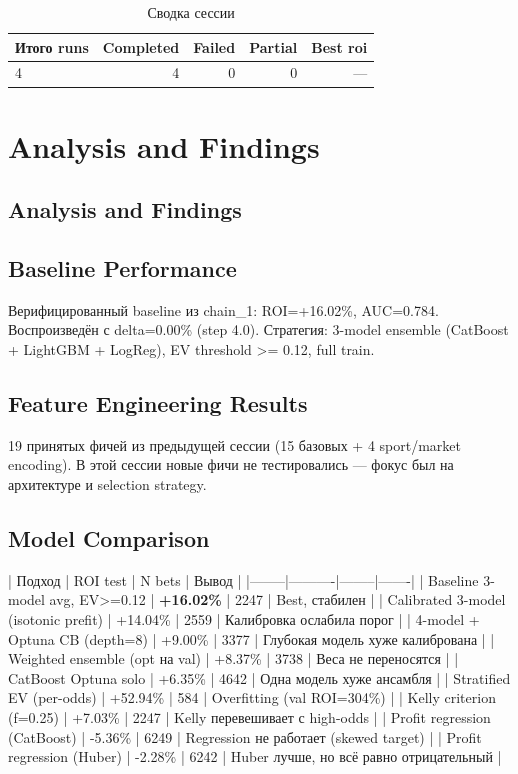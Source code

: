 \documentclass[12pt,a4paper]{article}
\begin{document}
\begin{table}[H]
\centering
\caption{Сводка сессии}
\begin{tabular}{lrrrr}
\toprule
Итого runs & Completed & Failed & Partial & Best roi \\
\midrule
4 & \textcolor{passcolor}{4}
    & \textcolor{failcolor}{0}
    & \textcolor{partialcolor}{0}
    & --- \\
\bottomrule
\end{tabular}
\end{table}







\section{Analysis and Findings}

\subsection{Analysis and Findings}

\subsection{Baseline Performance}
Верифицированный baseline из chain\_1: ROI=+16.02\%, AUC=0.784. Воспроизведён с delta=0.00\% (step 4.0). Стратегия: 3-model ensemble (CatBoost + LightGBM + LogReg), EV threshold >= 0.12, full train.

\subsection{Feature Engineering Results}
19 принятых фичей из предыдущей сессии (15 базовых + 4 sport/market encoding). В этой сессии новые фичи не тестировались — фокус был на архитектуре и selection strategy.

\subsection{Model Comparison}

| Подход | ROI test | N bets | Вывод |
|--------|----------|--------|-------|
| Baseline 3-model avg, EV>=0.12 | \textbf{+16.02\%} | 2247 | Best, стабилен |
| Calibrated 3-model (isotonic prefit) | +14.04\% | 2559 | Калибровка ослабила порог |
| 4-model + Optuna CB (depth=8) | +9.00\% | 3377 | Глубокая модель хуже калибрована |
| Weighted ensemble (opt на val) | +8.37\% | 3738 | Веса не переносятся |
| CatBoost Optuna solo | +6.35\% | 4642 | Одна модель хуже ансамбля |
| Stratified EV (per-odds) | +52.94\% | 584 | Overfitting (val ROI=304\%) |
| Kelly criterion (f=0.25) | +7.03\% | 2247 | Kelly перевешивает с high-odds |
| Profit regression (CatBoost) | -5.36\% | 6249 | Regression не работает (skewed target) |
| Profit regression (Huber) | -2.28\% | 6242 | Huber лучше, но всё равно отрицательный |
\end{document}

